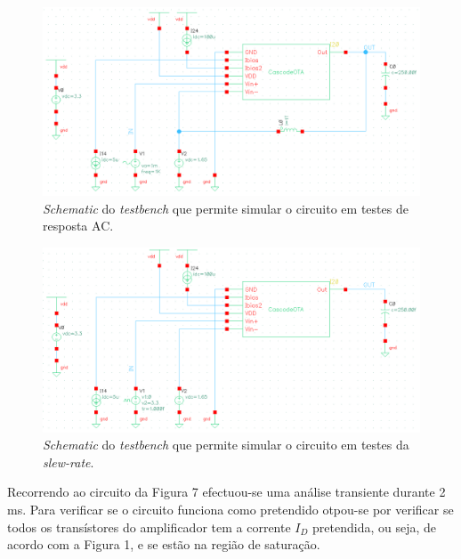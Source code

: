 \documentclass[11pt]{article}
\numberwithin{equation}{section}
\begin{document}
\vspace{4mm}

\begin{figure}[H]
	\centering
	\includegraphics[keepaspectratio=true, scale=0.60]{exps/TBac}
	\vspace{-0.5em}
	\caption{\textit{Schematic} do \textit{testbench} que permite simular o circuito em testes de resposta AC.}
	\vspace{-0.8em}
\end{figure} 

\begin{figure}[H]
	\centering
	\includegraphics[keepaspectratio=true, scale=0.60]{exps/TBslewrate}
	\vspace{-0.5em}
	\caption{\textit{Schematic} do \textit{testbench} que permite simular o circuito em testes da \textit{slew-rate}.}
	\vspace{-0.8em}
\end{figure} 

Recorrendo ao circuito da Figura 7 efectuou-se uma análise transiente durante 2 ms. Para verificar se o circuito funciona como pretendido otpou-se por verificar se todos os transístores do amplificador tem a corrente $I_D$ pretendida, ou seja, de acordo com a Figura 1, e se estão na região de saturação.
\end{document}
